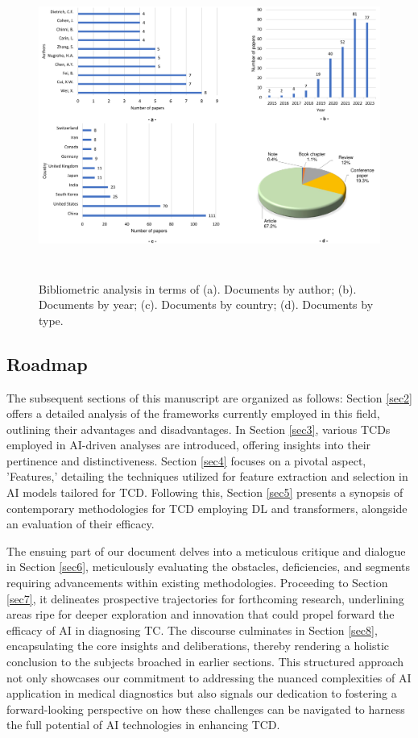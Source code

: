 \documentclass[a4paper,fleqn]{cas-sc}
\begin{document}
\begin{figure}[t!]
\centering
\includegraphics[height=10cm, width=16cm]{fig2}
\caption{Bibliometric analysis in terms of (a). Documents by author; (b). Documents by year; (c). Documents by country; (d). Documents by type.}
\label{figbibio}
\end{figure}


\subsection{Roadmap}
The subsequent sections of this manuscript are organized as follows: Section \ref{sec2} offers a detailed analysis of the frameworks currently employed in this field, outlining their advantages and disadvantages. In Section \ref{sec3}, various \acp{TCD} employed in AI-driven analyses are introduced, offering insights into their pertinence and distinctiveness. Section \ref{sec4} focuses on a pivotal aspect, 'Features,' detailing the techniques utilized for feature extraction and selection in AI models tailored for \ac{TCD}. Following this, Section \ref{sec5} presents a synopsis of contemporary methodologies for \ac{TCD} employing \ac{DL} and transformers, alongside an evaluation of their efficacy.

The ensuing part of our document delves into a meticulous critique and dialogue in Section \ref{sec6}, meticulously evaluating the obstacles, deficiencies, and segments requiring advancements within existing methodologies. Proceeding to Section \ref{sec7}, it delineates prospective trajectories for forthcoming research, underlining areas ripe for deeper exploration and innovation that could propel forward the efficacy of \ac{AI} in diagnosing TC. The discourse culminates in Section \ref{sec8}, encapsulating the core insights and deliberations, thereby rendering a holistic conclusion to the subjects broached in earlier sections. This structured approach not only showcases our commitment to addressing the nuanced complexities of \ac{AI} application in medical diagnostics but also signals our dedication to fostering a forward-looking perspective on how these challenges can be navigated to harness the full potential of \ac{AI} technologies in enhancing \ac{TCD}.
\end{document}
